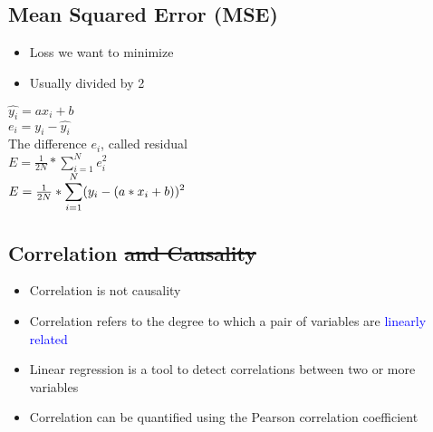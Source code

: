 \subsection{Mean Squared Error (MSE)}
\begin{itemize}
    \item Loss we want to minimize
    \item Usually divided by 2
\end{itemize}
\begin{center}
    $\hat{y_i} = ax_i + b$\\
    $e_i = y_i - \hat{y_i}$ \\
    The difference $e_i$, called residual\\
    $E = \frac{1}{2N} * \displaystyle\sum_{i = 1}^{N} e_i^2$\\
    $E = \frac{1}{2N} * \large\displaystyle\sum_{i = 1}^{N}({y_i} - (a*x_i + b))^2$
\end{center}

\subsection{Correlation \sout{and Causality}}
\begin{itemize}
    \item Correlation is not causality
    \item Correlation refers to the degree to which a pair of variables are \textcolor{blue}{linearly related}
    \item Linear regression is a tool to detect correlations between two or more variables
    \item Correlation can be quantified using the Pearson correlation coefficient
\end{itemize}
